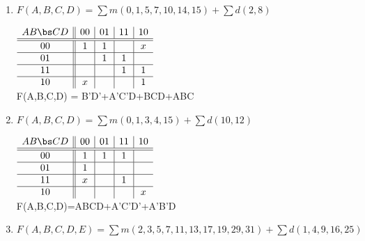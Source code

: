 \begin{enumerate}
\begin{enumerate}
\item $F(A,B,C,D)=\sum m(0,1,5,7,10,14,15)+\sum d(2,8)$

\begin{solution}{
$\begin{array} {c||c|c|c|c}
   A B \bs C D   & 00 & 01 & 11 & 10 \\ \hline \hline
       00        & 1  & 1  &    & x  \\ \hline
       01        &    & 1  & 1  &    \\ \hline
       11        &    &    & 1  & 1  \\ \hline
       10        & x  &    &    & 1  \\
\end{array}$ \\
F(A,B,C,D) = B'D'+A'C'D+BCD+ABC
} \end{solution}
\item $F(A,B,C,D)=\sum m(0,1,3,4,15)+\sum d(10,12)$

\begin{solution}{

$\begin{array} {c||c|c|c|c}
   A B \bs C D   & 00 & 01 & 11 & 10 \\ \hline \hline
       00        & 1  & 1  & 1  &    \\ \hline
       01        & 1  &    &    &    \\ \hline
       11        & x  &    & 1  &    \\ \hline
       10        &    &    &    & x  \\
\end{array}$ \\
F(A,B,C,D)=ABCD+A'C'D'+A'B'D
} \end{solution}
\item $F(A,B,C,D,E)=\sum m(2,3,5,7,11,13,17,19,29,31)+\sum d(1,4,9,16,25)$

\begin{solution}{

}
\end{solution}
\end{enumerate}
\end{enumerate}
